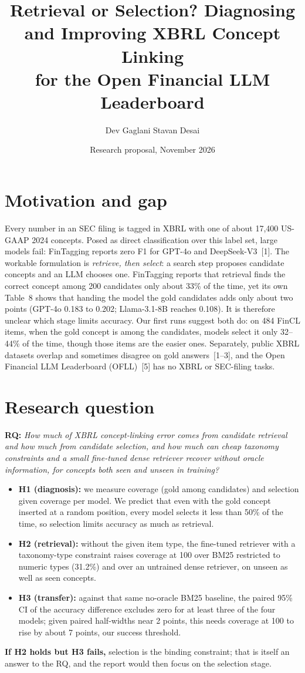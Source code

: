 \documentclass[10pt]{article}
\title{\vspace{-1.6cm}\large\textbf{Retrieval or Selection? Diagnosing and Improving XBRL Concept Linking\\
for the Open Financial LLM Leaderboard}}
\author{\normalsize Dev Gaglani \quad Stavan Desai}
\date{\normalsize Research proposal, November 2026}
\begin{document}
\maketitle
\vspace{-0.9cm}

\section{Motivation and gap}
Every number in an SEC filing is tagged in XBRL with one of about 17{,}400 US-GAAP 2024 concepts. Posed as direct
classification over this label set, large models fail: FinTagging reports zero F1 for GPT-4o and
DeepSeek-V3~[1]. The workable formulation is \emph{retrieve, then select}: a search step proposes candidate concepts
and an LLM chooses one. FinTagging reports that retrieval finds the correct concept among 200 candidates only about
33\% of the time, yet its own Table~8 shows that handing the model the gold candidates adds only about two points
(GPT-4o 0.183 to 0.202; Llama-3.1-8B reaches 0.108). It is therefore unclear which stage limits accuracy. Our first runs
suggest both do: on 484 FinCL items, when the gold concept is among the candidates, models select it only 32--44\% of
the time, though those items are the easier ones. Separately, public XBRL
datasets overlap and sometimes disagree on gold answers~[1--3], and the Open Financial LLM Leaderboard (OFLL)~[5] has no
XBRL or SEC-filing tasks.

\section{Research question}
\textbf{RQ:} \emph{How much of XBRL concept-linking error comes from candidate retrieval and how much from candidate
selection, and how much can cheap taxonomy constraints and a small fine-tuned dense retriever recover without oracle
information, for concepts both seen and unseen in training?}
\begin{itemize}
\item \textbf{H1 (diagnosis):} we measure coverage (gold among candidates) and selection given coverage per model. We
predict that even with the gold concept inserted at a random position, every model selects it less than 50\% of the time,
so selection limits accuracy as much as retrieval.
\item \textbf{H2 (retrieval):} without the given item type, the fine-tuned retriever with a taxonomy-type constraint raises
coverage at 100 over BM25 restricted to numeric types (31.2\%) and over an untrained dense retriever, on unseen as well as
seen concepts.
\item \textbf{H3 (transfer):} against that same no-oracle BM25 baseline, the paired 95\% CI of the accuracy difference
excludes zero for at least three of the four models; given paired half-widths near 2 points, this needs coverage at
100 to rise by about 7 points, our success threshold.
\end{itemize}
\textbf{If H2 holds but H3 fails,} selection is the binding constraint; that is itself an answer to the RQ, and the
report would then focus on the selection stage.
\end{document}

